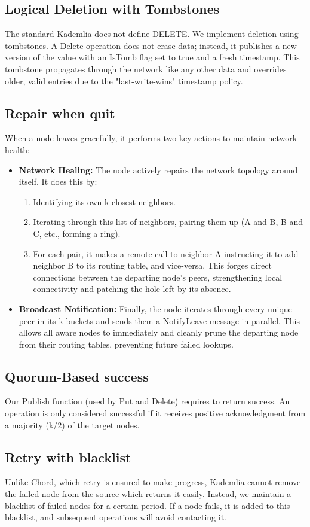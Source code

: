 \documentclass{article}
\begin{document}
\subsection{Logical Deletion with Tombstones}

The standard Kademlia does not define DELETE. We implement deletion using tombstones. A Delete operation does not erase data; instead, it publishes a new version of the value with an IsTomb flag set to true and a fresh timestamp. This tombstone propagates through the network like any other data and overrides older, valid entries due to the "last-write-wins" timestamp policy.

\subsection{Repair when quit}
When a node leaves gracefully, it performs two key actions to maintain network health:
\begin{itemize}
    \item \textbf{Network Healing:} The node actively repairs the network topology around itself. It does this by:
    \begin{enumerate}
        \item Identifying its own k closest neighbors.
        \item Iterating through this list of neighbors, pairing them up (A and B, B and C, etc., forming a ring).
        \item For each pair, it makes a remote call to neighbor A instructing it to add neighbor B to its routing table, and vice-versa. This forges direct connections between the departing node's peers, strengthening local connectivity and patching the hole left by its absence.
    \end{enumerate}
    \item \textbf{Broadcast Notification:} Finally, the node iterates through every unique peer in its k-buckets and sends them a NotifyLeave message in parallel. This allows all aware nodes to immediately and cleanly prune the departing node from their routing tables, preventing future failed lookups.
\end{itemize}

\subsection{Quorum-Based success}
Our Publish function (used by Put and Delete) requires to return success. An operation is only considered successful if it receives positive acknowledgment from a majority (k/2) of the target nodes.

\subsection{Retry with blacklist}
Unlike Chord, which retry is ensured to make progress, Kademlia cannot remove the failed node from the source which returns it easily. Instead, we maintain a blacklist of failed nodes for a certain period. If a node fails, it is added to this blacklist, and subsequent operations will avoid contacting it.
\end{document}
